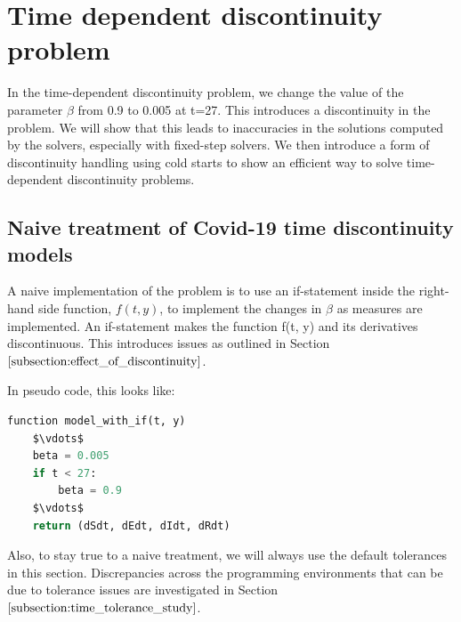 \section{Time dependent discontinuity problem}
\label{section:time_problem}
In the time-dependent discontinuity problem, we change the value of the parameter $\beta$ from 0.9 to 0.005 at t=27. This introduces a discontinuity in the problem. We will show that this leads to inaccuracies in the solutions computed by the solvers, especially with fixed-step solvers. We then introduce a form of discontinuity handling using cold starts to show an efficient way to solve time-dependent discontinuity problems.

\subsection{Naive treatment of Covid-19 time discontinuity models}
\label{subsection:naive_time_problem}
A naive implementation of the problem is to use an if-statement inside the right-hand side function, $f(t, y)$, to implement the changes in $\beta$ as measures are implemented. An if-statement makes the function f(t, y) and its derivatives discontinuous. This introduces issues as outlined in Section $\ref{subsection:effect_of_discontinuity}$.

In pseudo code, this looks like:

\begin{minipage}{\linewidth}
\begin{lstlisting}[language=Python]
function model_with_if(t, y)
    $\vdots$
    beta = 0.005
    if t < 27:
        beta = 0.9
    $\vdots$
    return (dSdt, dEdt, dIdt, dRdt)
\end{lstlisting}
\end{minipage}

Also, to stay true to a naive treatment, we will always use the default tolerances in this section. Discrepancies across the programming environments that can be due to tolerance issues are investigated in Section $\ref{subsection:time_tolerance_study}$.
